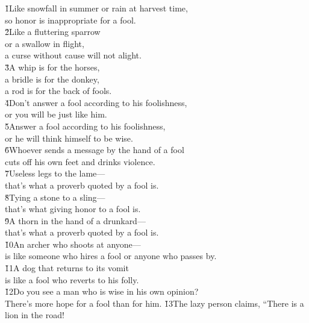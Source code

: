 \begin{poetry}
\poeml {}
\v{1}Like snowfall in summer or rain at harvest time, \\
\poeml so honor is inappropriate for a fool. \\
\poeml \v{2}Like a fluttering sparrow \\
\poemll    or a swallow in flight, \\
\poemlll       a curse without cause will not alight. \\
\poeml \v{3}A whip is for the horses, \\
\poemll    a bridle is for the donkey, \\
\poemlll       a rod is for the back of fools. \\
\poeml \v{4}Don't answer a fool according to his foolishness, \\
\poemll    or you will be just like him. \\
\poeml \v{5}Answer a fool according to his foolishness, \\
\poemll    or he will think himself to be wise. \\
\poeml \v{6}Whoever sends a message by the hand of a fool \\
\poemll    cuts off his own feet and drinks violence. \\
\poeml \v{7}Useless legs to the lame--- \\
\poemll    that's what a proverb quoted by a fool is. \\
\poeml \v{8}Tying a stone to a sling--- \\
\poemll    that's what giving honor to a fool is. \\
\poeml \v{9}A thorn in the hand of a drunkard--- \\
\poemll    that's what a proverb quoted by a fool is. \\
\poeml \v{10}An archer who shoots at anyone--- \\
\poemll    is like someone who hires a fool or anyone who passes by. \\
\poeml \v{11}A dog that returns to its vomit \\
\poemll    is like a fool who reverts to his folly. \\
\poeml \v{12}Do you see a man who is wise in his own opinion? \\
\poemll    There's more hope for a fool than for him.
\poeml \v{13}The lazy person claims, ``There is a lion in the road! \\

\end{poetry}
